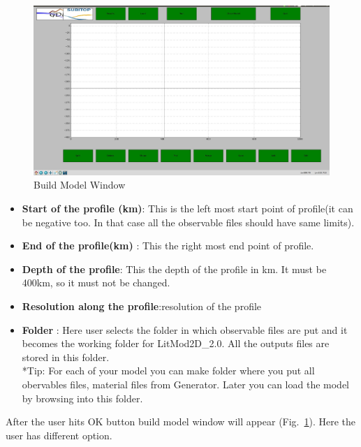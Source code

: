 \documentclass[14pt]{article}
\begin{document}
\begin{figure}
\centering \includegraphics[width=30pc]{./build2.jpg}
\caption{Build Model Window}
\label{build2}
\end{figure}

\begin{itemize}
\item \textbf{Start of the profile (km)}: This is the left most start point of profile(it can be negative too. In that case all the observable files should have same limits).
\item \textbf{End of the profile(km) }: This the right most end point of profile.
\item \textbf{Depth of the profile}: This the depth of the profile in km. It must be 400km, so it must not be changed.
\item \textbf{Resolution along the profile}:resolution of the profile

\item \textbf{Folder} : Here user selects the folder in which observable files are put and it becomes the working folder for LitMod2D\_2.0. All the outputs files are stored in this folder.\\
*Tip: For each of your model you can make folder where you put all obervables files, material files from Generator. Later you can load the model by browsing into this folder.
\end{itemize}
After the user hits OK button build model window will appear (Fig.~\ref{build2}). Here the user has different option.
\end{document}
